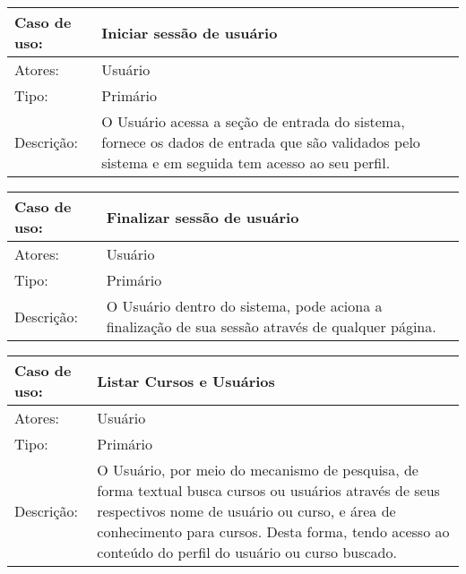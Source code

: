 \documentclass[12pt,a4paper,onecolumn,titlepage]{article}
\begin{document}
\begin{table}[h!]
\begin{center}
\begin{tabular}{p{2.5cm} p{9.5cm}}
Caso de uso: & \textbf{Iniciar sessão de usuário} \\ \hline
Atores: & Usuário \\ \hline
Tipo: & Primário \\ \hline
Descrição: & O Usuário acessa a seção de entrada do sistema, fornece os dados de entrada que são validados pelo sistema e em seguida tem acesso ao seu perfil.

\end{tabular}
\end{center}
\end{table}


\begin{table}[h!]
\begin{center}
\begin{tabular}{p{2.5cm} p{9.5cm}}
Caso de uso: & \textbf{Finalizar sessão de usuário} \\ \hline
Atores: & Usuário \\ \hline
Tipo: & Primário \\ \hline
Descrição: & O Usuário dentro do sistema, pode aciona a finalização de sua sessão através de qualquer página.

\end{tabular}
\end{center}
\end{table}

\clearpage

\begin{table}[h!]
\begin{center}
\begin{tabular}{p{2.5cm} p{9.5cm}}
Caso de uso: & \textbf{Listar Cursos e Usuários} \\ \hline
Atores: & Usuário \\ \hline
Tipo: & Primário \\ \hline
Descrição: & O Usuário, por meio do mecanismo de pesquisa, de forma textual busca cursos ou usuários através de seus respectivos nome de usuário ou curso, e área de conhecimento para cursos. Desta forma, tendo acesso ao conteúdo do perfil do usuário ou curso buscado.

\end{tabular}
\end{center}
\end{table}
\end{document}
